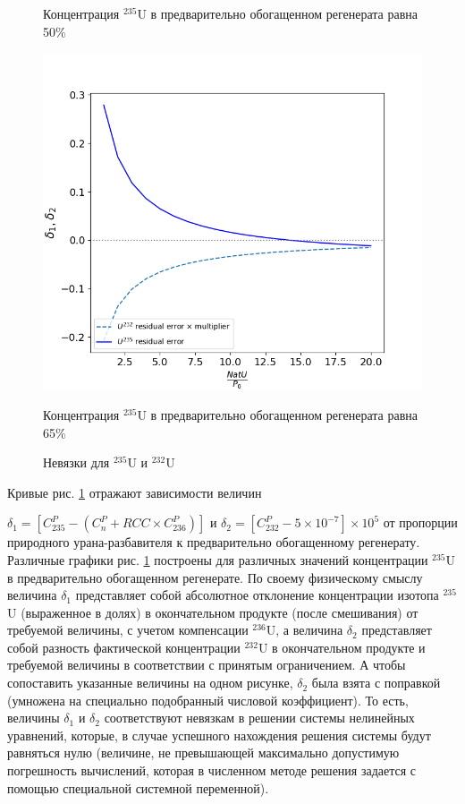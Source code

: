 \begin{figure}[ht]
\begin{minipage}{.5\textwidth}
    \caption{Концентрация $^{235}$U в предварительно обогащенном регенерата равна 50\%}
  \end{minipage}
  \begin{minipage}{.5\textwidth}
    \centering
    \includegraphics[width=.8\linewidth]{images/plots/65}  
    \caption{Концентрация $^{235}$U в предварительно обогащенном регенерата равна 65\%}
  \end{minipage}
  \caption{Невязки для $^{235}$U и $^{232}$U}
  \label{fig:deltas_ordinar}
 \end{figure}

Кривые рис. \ref{fig:deltas_ordinar} отражают зависимости величин

$\delta_1=\left[C_{235}^P-\left(C_n^P+RCC\times C_{236}^P\right)\right]$ и $\delta_2=\left[C_{232}^P-5\times10^{-7}\right]\times10^5$ от пропорции природного урана-разбавителя к предварительно обогащенному регенерату. Различные графики рис. \ref{fig:deltas_ordinar} построены для различных значений концентрации $^{235}$U в предварительно обогащенном регенерате. По своему физическому смыслу величина $\delta_1$ представляет собой абсолютное отклонение концентрации изотопа $^{235}$U (выраженное в долях) в окончательном продукте (после смешивания) от требуемой величины, с учетом компенсации $^{236}$U, а величина $\delta_2$ представляет собой разность фактической концентрации $^{232}$U в окончательном продукте и требуемой величины в соответствии с принятым ограничением. А чтобы сопоставить указанные величины на одном рисунке, $\delta_2$ была взята с поправкой (умножена на специально подобранный числовой коэффициент). То есть, величины $\delta_1$ и $\delta_2$ соответствуют невязкам в решении системы нелинейных уравнений, которые, в случае успешного нахождения решения системы будут равняться нулю (величине, не превышающей максимально допустимую погрешность вычислений, которая в численном методе решения задается с помощью специальной системной переменной).

